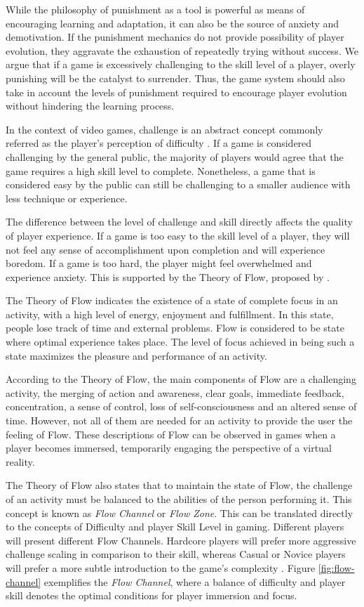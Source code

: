 While the philosophy of punishment as a tool is powerful as means of encouraging learning and adaptation, it can also be the source of anxiety and demotivation. If the punishment mechanics do not provide possibility of player evolution, they aggravate the exhaustion of repeatedly trying without success. We argue that if a game is excessively challenging to the skill level of a player, overly punishing will be the catalyst to surrender. Thus, the game system should also take in account the levels of punishment required to encourage player evolution without hindering the learning process.

In the context of video games, challenge is an abstract concept commonly referred as the player's perception of difficulty \cite{ARTICLE_RoleOfChallenge}. If a game is considered challenging by the general public, the majority of players would agree that the game requires a high skill level to complete. Nonetheless, a game that is considered easy by the public can still be challenging to a smaller audience with less technique or experience.

The difference between the level of challenge and skill directly affects the quality of player experience. If a game is too easy to the skill level of a player, they will not feel any sense of accomplishment upon completion and will experience boredom. If a game is too hard, the player might feel overwhelmed and experience anxiety. This is supported by the Theory of Flow, proposed by \cite{BOOK_Flow}.

The Theory of Flow indicates the existence of a state of complete focus in an activity, with a high level of energy, enjoyment and fulfillment. In this state, people lose track of time and external problems. Flow is considered to be state where optimal experience takes place. The level of focus achieved in being such a state maximizes the pleasure and performance of an activity.

According to the Theory of Flow, the main components of Flow are a challenging activity, the merging of action and awareness, clear goals, immediate feedback, concentration, a sense of control, loss of self-consciousness and an altered sense of time. However, not all of them are needed for an activity to provide the user the feeling of Flow. These descriptions of Flow can be observed in games when a player becomes immersed, temporarily engaging the perspective of a virtual reality.

The Theory of Flow also states that to maintain the state of Flow, the challenge of an activity must be balanced to the abilities of the person performing it. This concept is known as \emph{Flow Channel} or \emph{Flow Zone}. This can be translated directly to the concepts of Difficulty and player Skill Level in gaming. Different players will present different Flow Channels. Hardcore players will prefer more aggressive challenge scaling in comparison to their skill, whereas Casual or Novice players will prefer a more subtle introduction to the game's complexity \cite{ARTICLE_FlowInGames}. Figure \ref{fig:flow-channel} exemplifies the \emph{Flow Channel}, where a balance of difficulty and player skill denotes the optimal conditions for player immersion and focus.

